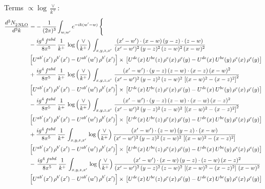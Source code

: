 \documentclass[10pt]{article}
\numberwithin{equation}{section}
\begin{document}
\noindent Terms $\propto\log\frac{\vee}{k^+}$:
\begin{align}
   \frac{d^{3}N_{2\,\rm NLO}^{\rm}}{d^{3}k}  & =  -\,\frac{1}{(2\pi)^{3}}  \int_{w, w^\prime} e^{-ik(w^\prime-w)}\, \Bigg\{\notag \\
& -\frac{ig^{4}\, f^{abd}}{8\pi^{5}}\, \frac{1}{k^{+}}\, \log{\left(\frac{\vee}{k^{+}}\right)}\,\int_{x,y,z,x'}\,\frac{(x'-w')\cdot (x-w)\, (y-z)\cdot (z-w)}{(x'-w')^{2}\, (y-z)^{2}\, (z-w)^{2}\,(x-w)^{2}}\, \notag \\ & \left[U^{ab'}(x')\,\rho^{b'}(x')-U^{ab'}(w')\, \rho^{b'}(x')\right]\times\,\left[U^{de}(x)\,U^{bc}(z)\, \rho^{e}(x)\,\rho^{c}(y)-U^{de}(x)\,U^{bc}(y)\,\rho^{e}(x)\,\rho^{c}(y)\right] \notag \\
&  + \frac{ig^{4}\, f^{abd}}{8\pi^{5}}\, \frac{1}{k^{+}}\,\log{\left(\frac{\vee}{k^{+}}\right)}\, \int_{x,y,z,x'}\,\frac{(x'-w')\cdot  (y-z)\, (z-w)\cdot (x-z)\, (x-w)^{2}}{(x'-w')^{2}\, (y-z)^{2}\, (z-w)^{2}\,\left[(x-w)^{2}-(x-z)^{2}\right]^{2}}\, \notag \\ & \left[U^{ab'}(x')\,\rho^{b'}(x')-U^{ab'}(w')\, \rho^{b'}(x')\right]\times\,\left[U^{de}(x)\,U^{bc}(z)\, \rho^{e}(x)\,\rho^{c}(y)-U^{de}(x)\,U^{bc}(y)\,\rho^{e}(x)\,\rho^{c}(y)\right] \notag \\
&   - \frac{ig^{4}\, f^{abd}}{8\pi^{5}}\, \frac{1}{k^{+}}\,\log{\left(\frac{\vee}{k^{+}}\right)}\, \int_{x,y,z,x'}\,\frac{(x'-w')\cdot  (y-z)\, (z-w)\cdot (x-w)\, (x-z)^{2}}{(x'-w')^{2}\, (y-z)^{2}\, (z-w)^{2}\,\left[(x-w)^{2}-(x-z)^{2}\right]^{2}}\, \notag \\ & \left[U^{ab'}(x')\,\rho^{b'}(x')-U^{ab'}(w')\, \rho^{b'}(x')\right]\times\,\left[U^{de}(x)\,U^{bc}(z)\, \rho^{e}(x)\,\rho^{c}(y)-U^{de}(x)\,U^{bc}(y)\,\rho^{e}(x)\,\rho^{c}(y)\right] \notag \\
&  + \frac{ig^{4}\, f^{abd}}{8\pi^{5}}\, \frac{1}{k^{+}}\, \int_{x,y,z,x'}\,\log{\left(\frac{\vee}{k^{+}}\right)}\,\frac{(x'-w')\cdot (z-w)\, (y-z)\cdot (x-w)}{(x'-w')^{2}\, (y-z)^{2}\, (z-w)^{2}\,\left[(x-w)^{2}-(x-z)^{2}\right]}\, \notag \\ & \left[U^{ab'}(x')\,\rho^{b'}(x')-U^{ab'}(w')\, \rho^{b'}(x')\right]\times\,\left[U^{de}(x)\,U^{bc}(z)\, \rho^{e}(x)\,\rho^{c}(y)-U^{de}(x)\,U^{bc}(y)\,\rho^{e}(x)\,\rho^{c}(y)\right] \notag \\
& -\,\frac{ig^{4}\, f^{abd}}{8\pi^{5}}\, \frac{1}{k^{+}}\, \int_{x,y,z,x'}\,\log{\left(\frac{\vee}{k^{+}}\right)}\,\frac{(x'-w')\cdot (x-w)\, (y-z)\cdot(z-w)\,(x-z)^{2}}{(x'-w')^{2}\, (y-z)^{2}\, (z-w)^{2}\,\left[(x-w)^{2}-(x-z)^{2}\right]\,(x-w)^{2}}\, \notag \\ & \left[U^{ab'}(x')\,\rho^{b'}(x')-U^{ab'}(w')\, \rho^{b'}(x')\right]\times\,\left[U^{de}(x)\,U^{bc}(z)\, \rho^{e}(x)\,\rho^{c}(y)-U^{de}(x)\,U^{bc}(y)\,\rho^{e}(x)\,\rho^{c}(y)\right] \notag \\

\end{align}
\end{document}
